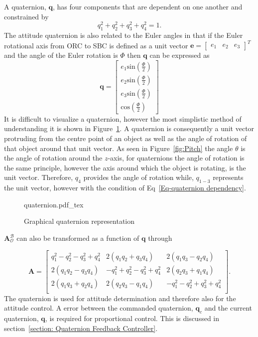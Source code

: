 A quaternion, $\mathbf{q}$, has four components that are dependent on one another and constrained by 
\begin{equation} 
\label{Eq-quaternion dependency}
q_1^2 + q_2^2 + q_3^2 + q_4^2 = 1.
\end{equation}
The attitude quaternion is also related to the Euler angles in that if the Euler rotational axis from ORC to SBC is defined as a unit vector $\mathbf{e} = \begin{bmatrix} e_1  & e_2 & e_3 \end{bmatrix}^T$ and the angle of the Euler rotation is $\Phi$ then $\mathbf{q}$ can be expressed as
\begin{equation}
\mathbf{q} = \begin{bmatrix} e_1 \text{sin}(\frac{\Phi}{2}) \\ e_2 \text{sin}(\frac{\Phi}{2}) \\ e_3 \text{sin}(\frac{\Phi}{2}) \\ \text{cos}(\frac{\Phi}{2}) \end{bmatrix}
\end{equation}
It is difficult to visualize a quaternion, however the most simplistic method of understanding it is shown in Figure~\ref{fig:quaternion}. A quaternion is consequently a unit vector protruding from the centre point of an object as well as the angle of rotation of that object around that unit vector. As seen in Figure~\ref{fig:Pitch} the angle $\theta$ is the angle of rotation around the $z$-axis, for quaternions the angle of rotation is the same principle, however the axis around which the object is rotating, is the unit vector. Therefore, $q_4$ provides the angle of rotation while, $q_{1-3}$ represents the unit vector, however with the condition of Eq~\ref{Eq-quaternion dependency}.

\begin{figure}[!htb]
	\centering
	\def\svgwidth{10cm}
	{quaternion.pdf_tex}
	\caption{Graphical quaternion representation}
	\label{fig:quaternion}
\end{figure}

$\boldsymbol{A}^{\mathcal{B}}_{\mathcal{O}}$ can also be transformed as a function of $\mathbf{q}$ \cite{wertz2012spacecraft} through

\begin{equation}
\label{eq:DCM_quaternion}
	\boldsymbol{A}
		= \begin{bmatrix}
		q_1^2 - q_2^2 - q_3^2 + q_4^2 & 2(q_1q_2 + q_3q_4) & 2(q_1q_3 - q_2q_4) \\
		2(q_1q_2 - q_3q_4) & -q_1^2 + q_2^2 - q_3^2 + q_4^2 & 2(q_2q_3 + q_1q_4) \\
		2(q_1q_3 + q_2q_4) & 2(q_2q_3 - q_1q_4) & -q_1^2 - q_2^2 + q_3^2 + q_4^2 \\
		\end{bmatrix}.
\end{equation}
The quaternion is used for attitude determination and therefore also for the attitude control. A error between the commanded quaternion, $\mathbf{q}_c$ and the current quaternion, $\mathbf{q}$, is required for proportional control. This is discussed in section~\ref{section: Quaternion Feedback Controller}.

